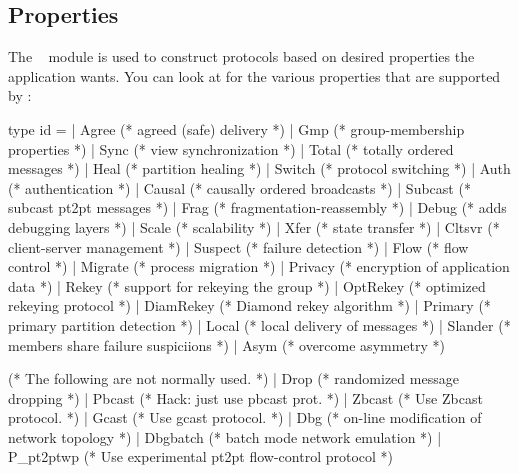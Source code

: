 \subsection{Properties}
\label{sec:properties}

The \ensemble\  module is used to construct protocols based on
desired properties the application wants.  You can look at 
for the various properties that are supported by \ensemble:
\begin{codebox}
type id =
  | Agree				(* agreed (safe) delivery *)
  | Gmp					(* group-membership properties *)
  | Sync				(* view synchronization *)
  | Total				(* totally ordered messages *)
  | Heal				(* partition healing *)
  | Switch				(* protocol switching *)
  | Auth				(* authentication *)
  | Causal				(* causally ordered broadcasts *)
  | Subcast				(* subcast pt2pt messages *)
  | Frag				(* fragmentation-reassembly *)
  | Debug				(* adds debugging layers *)
  | Scale				(* scalability *)
  | Xfer				(* state transfer *)
  | Cltsvr				(* client-server management *)
  | Suspect				(* failure detection *)
  | Flow				(* flow control *)
  | Migrate				(* process migration *)
  | Privacy				(* encryption of application data *)
  | Rekey				(* support for rekeying the group *)
  | OptRekey				(* optimized rekeying protocol *)
  | DiamRekey                           (* Diamond rekey algorithm *)
  | Primary				(* primary partition detection *)
  | Local				(* local delivery of messages *)
  | Slander				(* members share failure suspiciions *)
  | Asym			        (* overcome asymmetry *)

    (* The following are not normally used.
     *)
  | Drop				(* randomized message dropping *)
  | Pbcast				(* Hack: just use pbcast prot. *)
  | Zbcast                              (* Use Zbcast protocol. *)
  | Gcast                               (* Use gcast protocol. *)
  | Dbg                                 (* on-line modification of network topology *)
  | Dbgbatch                            (* batch mode network emulation *)
  | P_pt2ptwp                           (* Use experimental pt2pt flow-control protocol *)
\end{codebox}

